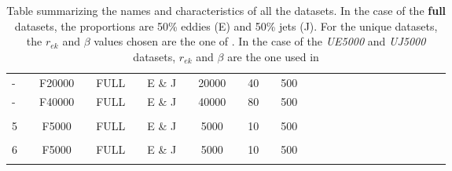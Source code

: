 \begin{table}[!b]
\begin{tabular}{llclclclclclclclclclclclcl}
-           &  &  F20000   &  & FULL          &  & E \& J           &  & 20000                &  & 40              &  & 500            \\ \rowcolor{Gray}
-           &  &  F40000   &  & FULL          &  & E \& J           &  & 40000                &  & 80              &  & 500            \\
\hline \\[-1.6em]
5           &  &  F5000    &  & FULL          &  & E \& J           &  & 5000                 &  & 10              &  & 500            \\ 
\hline \\[-1.6em]
6           &  &  F5000    &  & FULL          &  & E \& J           &  & 5000                 &  & 10              &  & 500            \\ [0.2em]
\Xhline{1.5pt}\\[-0.8em]      
\end{tabular}
\caption{Table summarizing the names and characteristics of all the datasets. In the case of the \textbf{full} datasets, the proportions are 50\% eddies (E) and 50\% jets (J). For the unique datasets, the $r_{e k}$ and $\beta$ values chosen are the one of \cite{Benchmarking}. In the case of the \textit{UE5000} and \textit{UJ5000} datasets, $r_{e k}$ and $\beta$ are the one used in \cite{Benchmarking}}
\label{C4 - TAB - DATASETS}
\end{table}
\bgroup